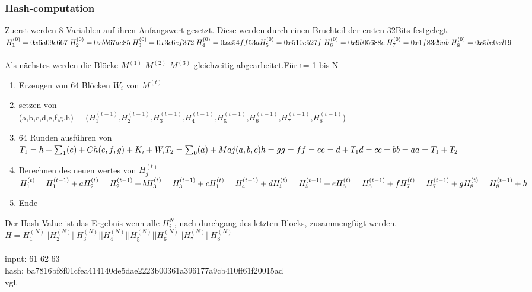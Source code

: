 {\subsubsection{Hash-computation}
\label{sec:hash-computation}
Zuerst werden 8 Variablen auf ihren Anfangswert gesetzt. Diese werden durch einen Bruchteil der ersten 32Bits festgelegt.\\
$H_1^{(0)} = 0x6a09e667\;  H_2^{(0)} = 0xbb67ae85\;   H_3^{(0)} = 0x3c6ef372 \;  H_4^{(0)} = 0xa54ff53a \\H_5^{(0)} = 0x510e527f\;  H_6^{(0)} = 0x9b05688c\;  H_7^{(0)} = 0x1f83d9ab\;H_8^{(0)} = 0x5be0cd19\;    $\\ \\
Als nächstes werden die Blöcke $M^{(1)}$ $M^{(2)}$ $M^{(3)}$ gleichzeitig abgearbeitet.Für t= 1 bis N
\begin{enumerate}
\item Erzeugen von 64 Blöcken $W_i$ von $M^{(t)}$
\item setzen von \\(a,b,c,d,e,f,g,h) = ($H_1^{(t-1)}$,$H_2^{(t-1)}$,$H_3^{(t-1)}$,$H_4^{(t-1)}$,$H_5^{(t-1)}$,$H_6^{(t-1)}$,$H_7^{(t-1)}$,$H_8^{(t-1)}$)
\item 64 Runden ausführen von\\$T_1 = h + {\sum_1} (e) + Ch(e, f, g) + K_i + W_i\\T_2 = \sum_0(a) + Maj(a,b,c)\\h = g\\g=f\\f=e\\e=d+ T_1\\d=c\\c=b\\b=a\\a=T_1+T_2$
\item Berechnen des neuen wertes von $H_j^{(t)}$\\$H_1^{(t)}  = H_1^{(t-1)} + a \\H_2^{(t)}  = H_2^{(t-1)} + b \\H_3^{(t)}  = H_3^{(t-1)} + c \\H_1^{(t)}  = H_4^{(t-1)} + d \\H_5^{(t)}  = H_5^{(t-1)} + e \\H_6^{(t)}  = H_6^{(t-1)} + f \\H_7^{(t)}  = H_7^{(t-1)} + g \\H_8^{(t)}  = H_8^{(t-1)} + h$
\item Ende
\end{enumerate}
Der Hash Value ist das Ergebnis wenn alle $H_i^N$, nach durchgang des letzten Blocks, zusammengfügt werden.\\$H = H_1^{(N)} || H_2^{(N)} || H_3^{(N)} || H_4^{(N)} || H_5^{(N)} || H_6^{(N)} || H_7^{(N)} || H_8^{(N)}$\\ \\
input: 61 62 63 \\
hash: ba7816bf8f01cfea414140de5dae2223b00361a396177a9cb410ff61f20015ad\\
vgl. \textcite{sha256}
}
